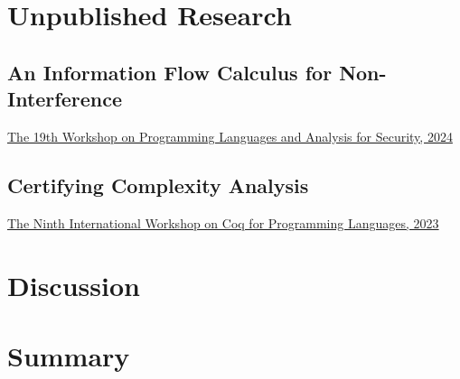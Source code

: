 \chapter{Unpublished Research}\label{ch:unpublished-research}\clearpage

\section{An Information Flow Calculus for Non-Interference}\label{ni-analysis}
{\href{https://plas24.github.io}
{The 19th Workshop on Programming Languages and Analysis for Security, 2024}}
{\abspage{}}

\clearpage

\section{Certifying Complexity Analysis}\label{coqpl}
\ainfoX{\CTNT}
{\href{https://popl23.sigplan.org/home/CoqPL-2023}
{The Ninth International Workshop on Coq for Programming Languages, 2023}}
{\abspage{}}

\clearpage

\chapter{Discussion}\label{ch:discussion}


\chapter{Summary}\label{ch:summary}


\backmatter
\printbibliography[label=chap:references, title=References]
\let\printbibliography\relax

